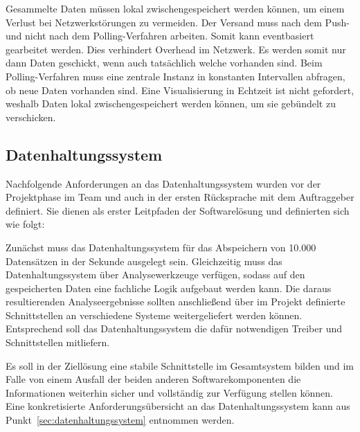 Gesammelte Daten müssen lokal zwischengespeichert werden können, um einem
Verlust bei Netzwerkstörungen zu vermeiden. Der Versand muss nach dem Push- und
nicht nach dem Polling-Verfahren arbeiten. Somit kann eventbasiert gearbeitet
werden. Dies verhindert Overhead im Netzwerk. Es werden somit nur dann Daten
geschickt, wenn auch tatsächlich welche vorhanden sind. Beim Polling-Verfahren
muss eine zentrale Instanz in konstanten Intervallen abfragen, ob neue Daten
vorhanden sind. Eine Visualisierung in Echtzeit ist nicht gefordert, weshalb
Daten lokal zwischengespeichert werden können, um sie gebündelt zu verschicken.
\tm%

\subsection{Datenhaltungssystem}
Nachfolgende Anforderungen an das Datenhaltungssystem wurden vor der
Projektphase im Team und auch in der ersten Rücksprache mit dem Auftraggeber
definiert. Sie dienen als erster Leitpfaden der Softwarelösung und definierten
sich wie folgt:

\begin{outline}
  \1 Zunächst muss das Datenhaltungssystem für das Abspeichern von 10.000
  Datensätzen in der Sekunde ausgelegt sein.
  \1 Gleichzeitig muss das Datenhaltungssystem über Analysewerkzeuge verfügen,
  sodass auf den gespeicherten Daten eine fachliche Logik aufgebaut werden
  kann.
  \1 Die daraus resultierenden Analyseergebnisse sollten anschließend über im
  Projekt definierte Schnittstellen an verschiedene Systeme weitergeliefert
  werden können. Entsprechend soll das Datenhaltungssystem die dafür
  notwendigen Treiber und Schnittstellen mitliefern.
\end{outline}

Es soll in der Ziellösung eine stabile Schnittstelle im Gesamtsystem bilden
und im Falle von einem Ausfall der beiden anderen Softwarekomponenten die
Informationen weiterhin sicher und vollständig zur Verfügung stellen können.
Eine konkretisierte Anforderungsübersicht an das Datenhaltungssystem kann aus
Punkt~\ref{sec:datenhaltungssystem} entnommen werden.
\nl%

